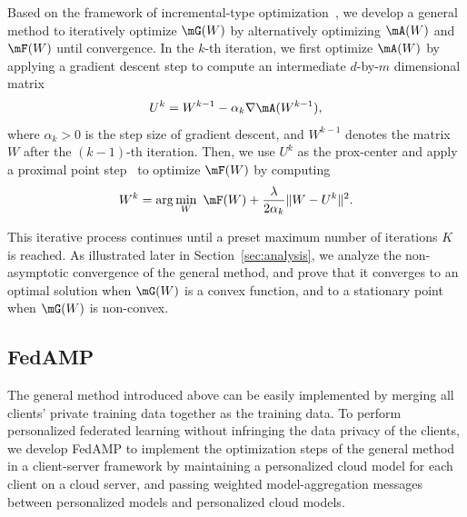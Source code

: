 Based on the framework of incremental-type optimization~\cite{bertsekas2011incremental}, we develop a general method to iteratively optimize $\mG(W)$ by alternatively optimizing $\mA(W)$ and $\mF(W)$ until convergence.
In the $k$-th iteration, we first optimize $\mA(W)$  by applying a gradient descent step to compute an intermediate $d$-by-$m$ dimensional matrix
\begin{equation}
\label{eq:grad-descent-intro}
U^k = W^{k-1} - \alpha_k\nabla\mA(W^{k-1}),
\end{equation} 
where $\alpha_k>0$ is the step size of gradient descent, and $W^{k-1}$ denotes the matrix $W$ after the $(k-1)$-th iteration.
Then, we use $U^k$ as the prox-center and apply a proximal point step~\cite{rockafellar1976monotone} to optimize $\mF(W)$ by computing
\begin{equation}
\label{eq:ppa-intro}
W^k = \arg\min_{W} \ \mF(W) + \frac{\lambda}{2\alpha_k}\|W - U^k\|^2.
\end{equation}

This iterative process continues until a preset maximum number of iterations $K$ is reached.
As illustrated later in Section~\ref{sec:analysis}, we analyze the non-asymptotic convergence of the general method, and prove that it converges to an optimal solution when $\mG(W)$ is a convex function, and to a stationary point when $\mG(W)$ is non-convex.








\subsection{FedAMP}

The general method introduced above can be easily implemented by merging all clients' private training data together as the training data. To perform personalized federated learning without infringing the data privacy of the clients, we develop FedAMP to implement the optimization steps of the general method in a client-server framework by maintaining a personalized cloud model for each client on a cloud server, and passing weighted model-aggregation messages between personalized models and personalized cloud models.

